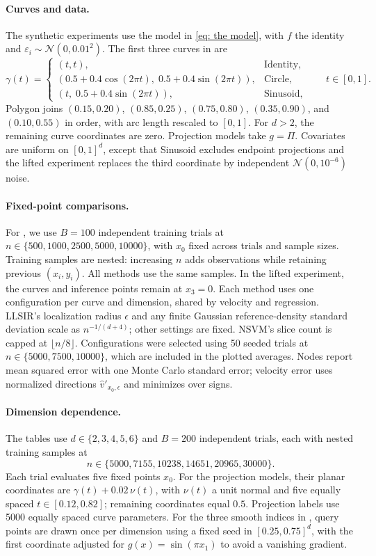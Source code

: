 \documentclass[11pt]{article}
\begin{document}
\begin{appendices}
\paragraph{Curves and data.} The synthetic experiments use the model in \cref{eq: the model}, with $f$ the identity and $\varepsilon_i\sim\mathcal{N}(0,0.01^2)$. The first three curves in  are
\[
\gamma(t)=
\begin{cases}
    (t,t), & \text{Identity},\\
    (0.5+0.4\cos(2\pi t),\;0.5+0.4\sin(2\pi t)), & \text{Circle},\\
    (t,\;0.5+0.4\sin(2\pi t)), & \text{Sinusoid},
\end{cases}
\qquad t\in[0,1].
\]
Polygon joins $(0.15,0.20)$, $(0.85,0.25)$, $(0.75,0.80)$, $(0.35,0.90)$, and $(0.10,0.55)$ in order, with arc length rescaled to $[0,1]$. For $d>2$, the remaining curve coordinates are zero. Projection models take $g=\Pi$. Covariates are uniform on $[0,1]^d$, except that Sinusoid excludes endpoint projections and the lifted experiment replaces the third coordinate by independent $\mathcal{N}(0,10^{-6})$ noise.

\paragraph{Fixed-point comparisons.} For , we use $B=100$ independent training trials at $n\in\{500,1000,2500,5000,10000\}$, with $x_0$ fixed across trials and sample sizes. Training samples are nested: increasing $n$ adds observations while retaining previous $(x_i,y_i)$. All methods use the same samples. In the lifted experiment, the curves and inference points remain at $x_3=0$. Each method uses one configuration per curve and dimension, shared by velocity and regression. LLSIR's localization radius $\epsilon$ and any finite Gaussian reference-density standard deviation scale as $n^{-1/(d+4)}$; other settings are fixed. NSVM's slice count is capped at $\lfloor n/8\rfloor$. Configurations were selected using 50 seeded trials at $n\in\{5000,7500,10000\}$, which are included in the plotted averages. Nodes report mean squared error with one Monte Carlo standard error; velocity error uses normalized directions $\hat v'_{x_0,\epsilon}$ and minimizes over signs.

\paragraph{Dimension dependence.} The tables use $d\in\{2,3,4,5,6\}$ and $B=200$ independent trials, each with nested training samples at
\[
    n\in\{5000,7155,10238,14651,20965,30000\}.
\]
Each trial evaluates five fixed points $x_0$. For the projection models, their planar coordinates are $\gamma(t)+0.02\,\nu(t)$, with $\nu(t)$ a unit normal and five equally spaced $t\in[0.12,0.82]$; remaining coordinates equal $0.5$. Projection labels use 5000 equally spaced curve parameters. For the three smooth indices in , query points are drawn once per dimension using a fixed seed in $[0.25,0.75]^d$, with the first coordinate adjusted for $g(x)=\sin(\pi x_1)$ to avoid a vanishing gradient.


\end{appendices}
\end{document}
